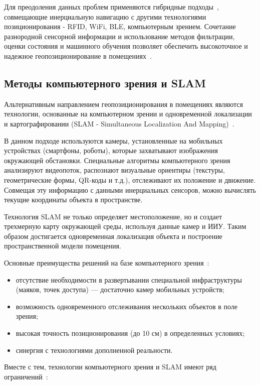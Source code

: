 Для преодоления данных проблем применяются гибридные подходы~\cite{hybridilf}, совмещающие инерциальную навигацию с другими технологиями позиционирования - RFID, WiFi, BLE, компьютерным зрением. Сочетание разнородной сенсорной информации и использование методов фильтрации, оценки состояния и машинного обучения позволяет обеспечить высокоточное и надежное геопозиционирование в помещениях~\cite{basebook}.

\subsection{Методы компьютерного зрения и SLAM}

Альтернативным направлением геопозиционирования в помещениях являются технологии, основанные на компьютерном зрении и одновременной локализации и картографировании (SLAM - Simultaneous Localization And Mapping)~\cite{slambased}.

В данном подходе используются камеры, установленные на мобильных устройствах (смартфоны, роботы), которые захватывают изображения окружающей обстановки. Специальные алгоритмы компьютерного зрения анализируют видеопоток, распознают визуальные ориентиры (текстуры, геометрические формы, QR-коды и т.д.), отслеживают их положение и движение. Совмещая эту информацию с данными инерциальных сенсоров, можно вычислять текущие координаты объекта в пространстве.

Технология SLAM не только определяет местоположение, но и создает трехмерную карту окружающей среды, используя данные камер и ИИУ. Таким образом достигается одновременная локализация объекта и построение пространственной модели помещения.

Основные преимущества решений на базе компьютерного зрения~\cite{compvision}:

\begin{itemize}[label=---]
    \item отсутствие необходимости в развертывании специальной инфраструктуры (маяков, точек доступа) --- достаточно камер мобильных устройств;
    \item возможность одновременного отслеживания нескольких объектов в поле зрения;
    \item высокая точность позиционирования (до 10 см) в определенных условиях;
    \item синергия с технологиями дополненной реальности.
\end{itemize}


Вместе с тем, технологии компьютерного зрения и SLAM имеют ряд ограничений~\cite{slambased}:

